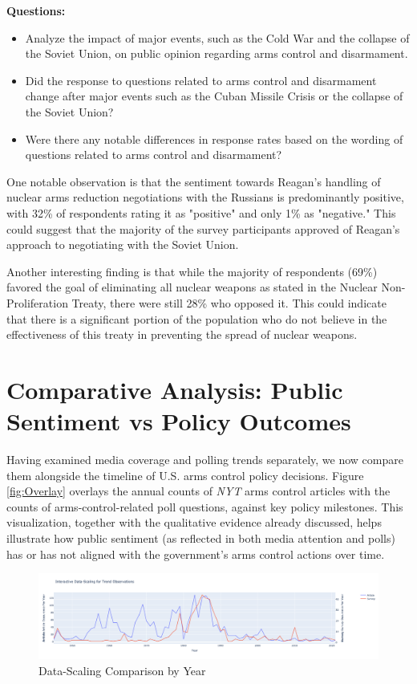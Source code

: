 \documentclass[11,5 pt]{article}
\begin{document}
    \textbf{Questions:}

    \begin{itemize}
        \item Analyze the impact of major events, such as the Cold War and the collapse of the Soviet Union, on public opinion regarding arms control and disarmament. 
        \item Did the response to questions related to arms control and disarmament change after major events such as the Cuban Missile Crisis or the collapse of the Soviet Union?
        \item Were there any notable differences in response rates based on the wording of questions related to arms control and disarmament?
    \end{itemize}
    
    One notable observation is that the sentiment towards Reagan's handling of nuclear arms reduction negotiations with the Russians is predominantly positive, with 32\% of respondents rating it as "positive" and only 1\% as "negative." This could suggest that the majority of the survey participants approved of Reagan's approach to negotiating with the Soviet Union. 
    
    Another interesting finding is that while the majority of respondents (69\%) favored the goal of eliminating all nuclear weapons as stated in the Nuclear Non-Proliferation Treaty, there were still 28\% who opposed it. This could indicate that there is a significant portion of the population who do not believe in the effectiveness of this treaty in preventing the spread of nuclear weapons.


\section{Comparative Analysis: Public Sentiment vs Policy Outcomes}

    Having examined media coverage and polling trends separately, we now compare them alongside the timeline of U.S. arms control policy decisions. Figure \ref{fig:Overlay} overlays the annual counts of \textit{NYT} arms control articles with the counts of arms-control-related poll questions, against key policy milestones. This visualization, together with the qualitative evidence already discussed, helps illustrate how public sentiment (as reflected in both media attention and polls) has or has not aligned with the government’s arms control actions over time.
    
    \begin{figure}[!htb]
        \centering
        \includegraphics[scale=0.265]{images/Data_Overlay.png}
        \caption{Data-Scaling Comparison by Year}
        \label{fig:Survey Data & Article}
    \end{figure}
    
\end{document}
